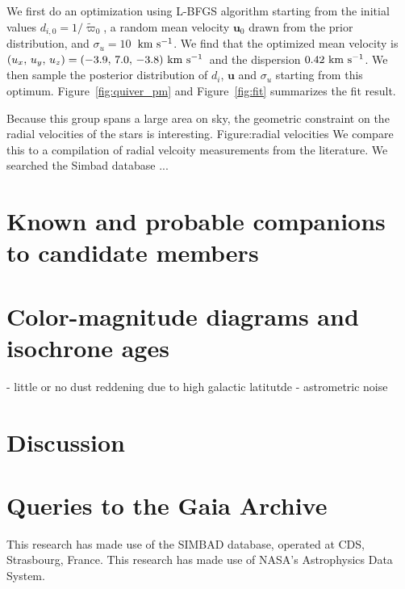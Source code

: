 \documentclass[modern,letterpaper]{aastex61}
\newcommand{\figname}{Figure}
\newcommand{\bs}[1]{\boldsymbol{#1}}
\renewcommand{\vec}[1]{\bs{#1}}
\newcommand{\kms}{\ensuremath{\rm km~s^{-1}}}
\newcommand{\todo}[1]{{\color{crimson}#1}}
\newcommand{\meanVelocityOpt}{\ensuremath{(u_x,\,u_y,\,u_z) = (-3.9,\,7.0,\,-3.8)~\kms}}
\newcommand{\sigVelocityOpt}{\ensuremath{0.42~\kms}}
\begin{document}
We first do an optimization using L-BFGS algorithm starting from the
initial values $d_{i,0} = 1/{\tilde \varpi_0}$, a random mean velocity $\vec{u}_0$
drawn from the prior distribution, and $\sigma_u=10$~\kms.
We find that the optimized mean velocity is \meanVelocityOpt\ and the dispersion \sigVelocityOpt.
We then sample the posterior distribution of $d_i$, $\vec{u}$ and $\sigma_u$ starting
from this optimum.
\figname~\ref{fig:quiver_pm} and \figname~\ref{fig:fit} summarizes
the fit result.


Because this group spans a large area on sky,
the geometric constraint on the radial velocities of the stars is interesting.
\todo{Figure:radial velocities}
We compare this to a compilation of radial velcoity measurements from the literature.
We searched the Simbad database ...

\section{Known and probable companions to candidate members}

\section{Color-magnitude diagrams and isochrone ages}


- little or no dust reddening due to high galactic latitutde
- astrometric noise


\section{Discussion}
\label{sec:discussion}

% 




\appendix

\section{Queries to the Gaia Archive}


\acknowledgements
This research has made use of the SIMBAD database,
operated at CDS, Strasbourg, France.
This research has made use of NASA's Astrophysics Data System.



\end{document}
